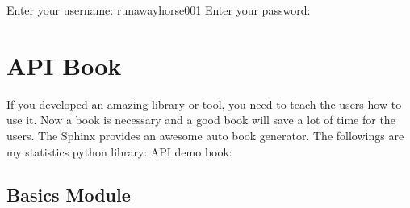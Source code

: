 \documentclass[letterpaper,12pt,english]{sphinxmanual}
\begin{document}
\begin{sphinxVerbatim}[commandchars=\\\{\}]
Enter your username: runawayhorse001
Enter your password:
\end{sphinxVerbatim}


\chapter{API Book}
\label{\detokenize{api:api-book}}\label{\detokenize{api:api}}\label{\detokenize{api::doc}}
If you developed an amazing library or tool, you need to teach the users how to use it. Now a  book is necessary and a good  book will save a lot of time for the users. The Sphinx provides an awesome auto  book generator. The followings are my statistics python library:  API demo book:


\section{Basics Module}
\label{\detokenize{api:basics-module}}

\subsection{}
\label{\detokenize{api:module-statspy.basics}}\label{\detokenize{api:rnorm}}
\end{document}
